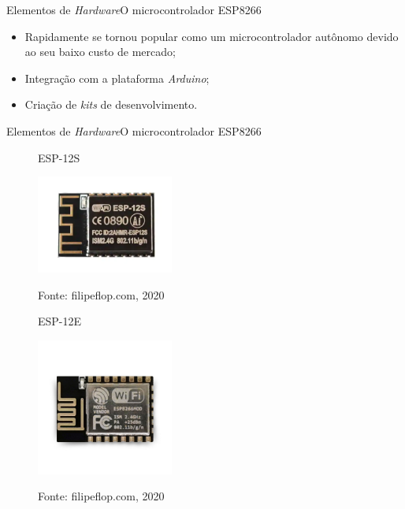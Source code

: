 \begin{frame}{Elementos de \textit{Hardware}}{O microcontrolador ESP8266}
    \begin{itemize}
        \item Rapidamente se tornou popular como um microcontrolador autônomo devido ao seu baixo custo de mercado;
        \item Integração com a plataforma \textit{Arduino};
        \item Criação de \textit{kits} de desenvolvimento.
    \end{itemize}

\end{frame}

\begin{frame}{Elementos de \textit{Hardware}}{O microcontrolador ESP8266}
    \vspace*{-0.4cm}
    \begin{figure}[!ht]
        \centering
        \hspace*{0.1cm}
        \begin{minipage}{0.5\linewidth}
            \centering
            \caption{ESP-12S}
            \includegraphics[width=0.4\textwidth]{figuras/ESP-12S.png}
            \label{fig:esp12s}
            \caption*{\tiny{Fonte: filipeflop.com, 2020}}
        \end{minipage}\hfill
        \begin{minipage}{0.5\linewidth}
            \centering
            \caption{ESP-12E}
            \hspace*{0.5cm}
            \includegraphics[width=0.4\textwidth]{figuras/ESP-12E.png}
            \label{fig:esp12e}
            \vspace*{-0.5cm}
            \caption*{\tiny{Fonte: filipeflop.com, 2020}}
        \end{minipage}
    \end{figure}

\end{frame}


